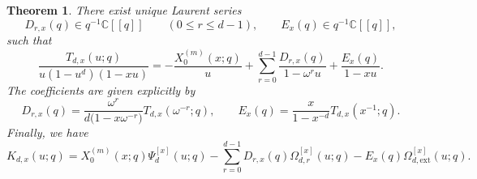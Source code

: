 \documentclass[12pt]{amsart}
\numberwithin{equation}{section}
\newtheorem{theorem}{Theorem}[section]
\newcommand{\CC}{\mathbb C}
\begin{document}
\begin{theorem}\label{thm:general-root:iii}
    There exist unique Laurent series
\[
D_{r,x}(q)\in q^{-1}\CC[[q]]\qquad (0\leq r\leq d-1),
\qquad
E_x(q)\in q^{-1}\CC[[q]],
\]
such that
\begin{equation}\label{eq:partial-fractions-general}
\frac{T_{d,x}(u;q)}{u(1-u^d)(1-xu)}
=
-\frac{X_0^{(m)}(x;q)}{u}
+
\sum_{r=0}^{d-1}\frac{D_{r,x}(q)}{1-\omega^r u}
+
\frac{E_x(q)}{1-xu}.
\end{equation}
The coefficients are given explicitly by
\begin{equation}\label{eq:D-general-explicit}
D_{r,x}(q)=\frac{\omega^r}{d\bigl(1-x\omega^{-r}\bigr)}T_{d,x}(\omega^{-r};q),
\qquad
E_x(q)=\frac{x}{1-x^{-d}}T_{d,x}(x^{-1};q).
\end{equation}
Finally, we have
\begin{equation}\label{eq:Kd-decomposition-general}
K_{d,x}(u;q)
=
X_0^{(m)}(x;q)\Psi_d^{[x]}(u;q)
-
\sum_{r=0}^{d-1}D_{r,x}(q)\Omega_{d,r}^{[x]}(u;q)
-
E_x(q)\Omega_{d,\mathrm{ext}}^{[x]}(u;q).
\end{equation}
\end{theorem}
\end{document}
